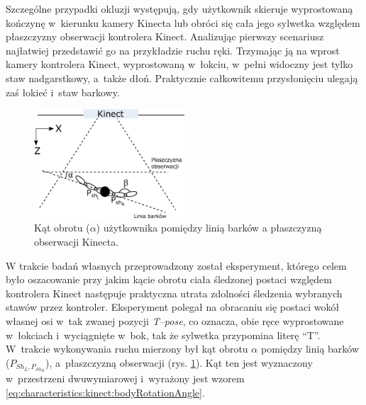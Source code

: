 Szczególne przypadki okluzji występują, gdy użytkownik skieruje wyprostowaną kończynę w~kierunku kamery Kinecta lub obróci się cała jego sylwetka względem płaszczyzny obserwacji kontrolera Kinect. Analizując pierwszy scenariusz najłatwiej przedstawić go na przykładzie ruchu ręki. Trzymając ją na wprost kamery kontrolera Kinect, wyprostowaną w~łokciu, w~pełni widoczny jest tylko staw nadgarstkowy, a~także dłoń. Praktycznie całkowitemu przysłonięciu ulegają zaś łokieć i~staw barkowy. 
																																			
\begin{savenotes}
	\begin{figure}[!htb]
		\centering
		\includegraphics[width=0.5\textwidth]{images/kinectAngle.png}
		\caption{Kąt obrotu ($\alpha$) użytkownika pomiędzy linią barków a płaszczyzną obserwacji Kinecta. }
		\label{fig:characteristics:kinect:bodyRotationAngle}
	\end{figure}
\end{savenotes}
																																					
W trakcie badań własnych przeprowadzony został eksperyment, którego celem było oszacowanie przy jakim kącie obrotu ciała śledzonej postaci względem kontrolera Kinect następuje praktyczna utrata zdolności śledzenia wybranych stawów przez kontroler. Eksperyment polegał na obracaniu się postaci wokół własnej osi w~tak zwanej pozycji \emph{T--pose}, co oznacza, obie ręce wyprostowane w~łokciach i~wyciągnięte w~bok, tak że sylwetka przypomina literę "`T"'. W~trakcie wykonywania ruchu mierzony był kąt obrotu $\alpha$ pomiędzy linią barków ($P_{{Sh}_L, P_{{Sh}_R}}$), a~płaszczyzną obserwacji (rys. \ref{fig:characteristics:kinect:bodyRotationAngle}). Kąt ten jest wyznaczony w~przestrzeni dwuwymiarowej i~wyrażony jest wzorem \ref{eq:characteristics:kinect:bodyRotationAngle}.
																																			
